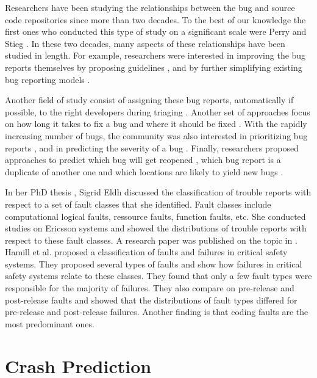 Researchers have been studying the relationships between the bug and source code repositories since more than two decades.
To the best of our knowledge the first ones who conducted this type of study on a significant scale were Perry and Stieg \cite{PerryDewayneE.1993}.
In these two decades, many aspects of these relationships have been studied in length.
For example, researchers were interested in improving the bug reports themselves by proposing guidelines \cite{Bettenburg2008}, and by further simplifying existing bug reporting models \cite{Herraiz2008}.

Another field of study consist of assigning these bug reports, automatically if possible, to the right developers during triaging \cite{Anvik2006,Jeong2009,Tamrawi2011a,Bortis2013}.
Another set of approaches focus on how long it takes to fix a bug \cite{Bhattacharya2011,Zhang2013,Saha2014} and where it should be fixed \cite{Zeller2013a,Zhou2012}.
With the rapidly increasing number of bugs, the community was also interested in prioritizing bug reports \cite{Kim2011c}, and in predicting the severity of a bug \cite{Lamkanfi2010}.
Finally, researchers proposed approaches to predict which bug will get reopened \cite{Zimmermann2012,Lo2013}, which bug report is a duplicate of another one \cite{Bettenburg2008a,Tian2012a,Jalbert2008} and which locations are likely to yield new bugs \cite{Kim2006,Kim2007a}.

In her PhD thesis \cite{Eldh2001}, Sigrid Eldh discussed the classification of trouble reports with respect to a set of fault classes that she identified.
Fault classes include computational logical faults, ressource faults, function faults, etc.
She conducted studies on Ericsson systems and showed the distributions of trouble reports with respect to these fault classes.
A research paper was published on the topic in \cite{Eldh2007}.
Hamill et al.\cite{Hamill2014} proposed a classification of faults and failures in critical safety systems.
They proposed several types of faults and show how failures in critical safety systems relate to these classes.
They found that only a few fault types were responsible for the majority of failures.
They also compare on pre-release and post-release faults and showed that the distributions of fault types differed for pre-release and post-release failures.
Another finding is that coding faults are the most predominant ones.

\section{Crash Prediction}

